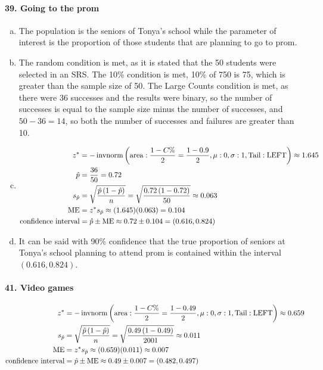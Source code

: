 		\paragraph{39. Going to the prom}
			\begin{enumerate}[a.]
				\item
					The population is the seniors of Tonya's school while the parameter of interest is the proportion of those students that are planning to go to prom.
				\item
					The random condition is met, as it is stated that the 50 students were selected in an SRS.
					 The 10\% condition is met, 10\% of 750 is 75, which is greater than the sample size of 50.
					The Large Counts condition is met, as there were 36 successes and the results were binary, so the number of successes is equal to the sample size minus the number of successes, and $50 - 36 = 14$, so both the number of successes and failures are greater than 10.
				\item
					\begin{align*}
						z^* &= -\operatorname{invnorm}\left(\operatorname{area}:\frac{1 - C\%}{2} = \frac{1 - 0.9}{2}, \mu: 0, \sigma: 1, \mathrm{Tail: LEFT}\right) \approx 1.645 \\
						\hat{p} &= \frac{36}{50} = 0.72 \\
						s_{\hat{p}} &= \sqrt{\frac{\hat{p}\left(1 - \hat{p}\right)}{n}} = \sqrt{\frac{0.72\left(1 - 0.72\right)}{50}} \approx 0.063\\
						\operatorname{ME} &= z^*s_{\hat{p}} \approx (1.645)(0.063) = 0.104 \\
						\text{confidence interval} &= \hat{p} \pm \operatorname{ME} \approx 0.72 \pm 0.104 = (0.616, 0.824)
					\end{align*}
				\item
					It can be said with 90\% confidence that the true proportion of seniors at Tonya's school planning to attend prom is contained within the interval $(0.616, 0.824)$.
			\end{enumerate}
		\paragraph{41. Video games}
			\begin{align*}
				z^* &= -\operatorname{invnorm}\left(\operatorname{area}:\frac{1 - C\%}{2} = \frac{1 - 0.49}{2}, \mu: 0, \sigma: 1, \mathrm{Tail: LEFT}\right) \approx 0.659 \\
				s_{\hat{p}} &= \sqrt{\frac{\hat{p}\left(1 - \hat{p}\right)}{n}} = \sqrt{\frac{0.49\left(1 - 0.49\right)}{2001}} \approx 0.011 \\
				\operatorname{ME} &= z^*s_{\hat{p}} \approx (0.659)(0.011) \approx 0.007 \\
				\text{confidence interval} &= \hat{p} \pm \operatorname{ME} \approx 0.49 \pm 0.007 = (0.482, 0.497)
			\end{align*}
